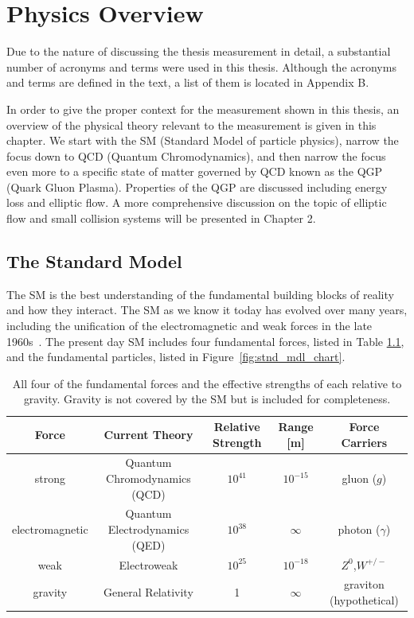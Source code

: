 \chapter{Physics Overview}
Due to the nature of discussing the thesis measurement in detail, a substantial number of acronyms and terms were used in this thesis. Although the acronyms and terms are defined in the text, a list of them is located in Appendix B.

In order to give the proper context for the measurement shown in this thesis,  an overview of the physical theory relevant to the measurement is given in this chapter. We start with the SM (Standard Model of particle physics), narrow the focus down to QCD (Quantum Chromodynamics), and then narrow the focus even more to a specific state of matter governed by QCD known as the QGP (Quark Gluon Plasma). Properties of the QGP are discussed including energy loss and elliptic flow. A more comprehensive discussion on the topic of elliptic flow and small collision systems will be presented in Chapter 2.
\section{The Standard Model}
The SM is the best understanding of the fundamental building blocks of reality and how they interact. The SM as we know it today has evolved over many years, including the unification of the electromagnetic and weak forces in the late 1960s~\cite{BILENKY198273}. The present day SM includes four fundamental forces, listed in Table \ref{tbl:sm}, and the fundamental particles, listed in Figure~\ref{fig:stnd_mdl_chart}.
\begin{table}[h!]
\caption{All four of the fundamental forces and the effective strengths of each relative to gravity. Gravity is not covered by the SM but is included for completeness.}
\centering
\begin{adjustbox}{width=\textwidth}
    \begin{tabular}{ccccc}
    \hline
    Force &Current Theory  & Relative Strength & Range [m] &  Force Carriers\\ \hline
    strong  & Quantum Chromodynamics (QCD) & $10^{41}$ & $10^{-15}$&  gluon ($g$)\\
    electromagnetic &Quantum Electrodynamics (QED) & $10^{38}$ & $\infty$  &  photon ($\gamma$)\\
    weak & Electroweak & $10^{25}$ &  $10^{-18}$ & $Z^0$,$W^{+/-}$\\
    gravity & General Relativity & 1 & $\infty$ & graviton (hypothetical)\\ \hline
    \end{tabular}
\end{adjustbox}
\label{tbl:sm}
\end{table}

